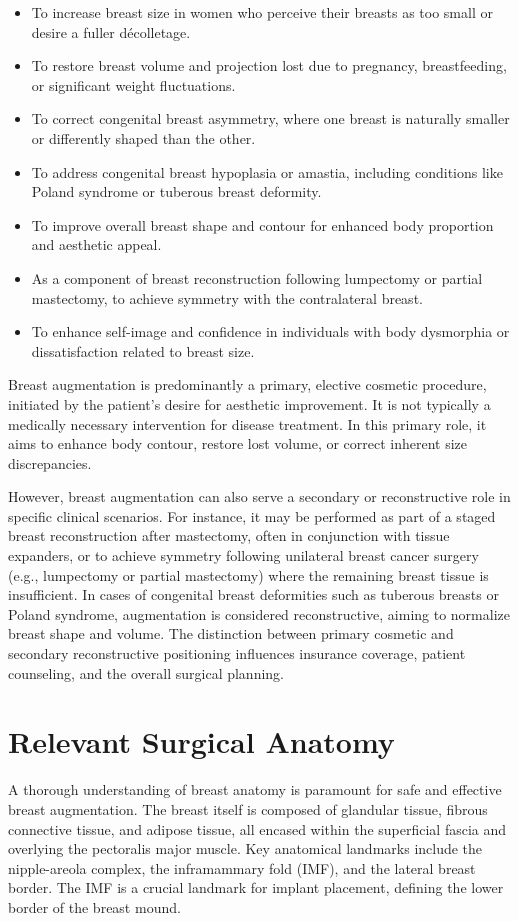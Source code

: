 \begin{itemize}
  \item To increase breast size in women who perceive their breasts as too small or desire a fuller décolletage.
  \item To restore breast volume and projection lost due to pregnancy, breastfeeding, or significant weight fluctuations.
  \item To correct congenital breast asymmetry, where one breast is naturally smaller or differently shaped than the other.
  \item To address congenital breast hypoplasia or amastia, including conditions like Poland syndrome or tuberous breast deformity.
  \item To improve overall breast shape and contour for enhanced body proportion and aesthetic appeal.
  \item As a component of breast reconstruction following lumpectomy or partial mastectomy, to achieve symmetry with the contralateral breast.
  \item To enhance self-image and confidence in individuals with body dysmorphia or dissatisfaction related to breast size.
\end{itemize}

Breast augmentation is predominantly a primary, elective cosmetic procedure, initiated by the patient's desire for aesthetic improvement. It is not typically a medically necessary intervention for disease treatment. In this primary role, it aims to enhance body contour, restore lost volume, or correct inherent size discrepancies.

However, breast augmentation can also serve a secondary or reconstructive role in specific clinical scenarios. For instance, it may be performed as part of a staged breast reconstruction after mastectomy, often in conjunction with tissue expanders, or to achieve symmetry following unilateral breast cancer surgery (e.g., lumpectomy or partial mastectomy) where the remaining breast tissue is insufficient. In cases of congenital breast deformities such as tuberous breasts or Poland syndrome, augmentation is considered reconstructive, aiming to normalize breast shape and volume. The distinction between primary cosmetic and secondary reconstructive positioning influences insurance coverage, patient counseling, and the overall surgical planning.

\section*{Relevant Surgical Anatomy}
A thorough understanding of breast anatomy is paramount for safe and effective breast augmentation. The breast itself is composed of glandular tissue, fibrous connective tissue, and adipose tissue, all encased within the superficial fascia and overlying the pectoralis major muscle. Key anatomical landmarks include the nipple-areola complex, the inframammary fold (IMF), and the lateral breast border. The IMF is a crucial landmark for implant placement, defining the lower border of the breast mound.

